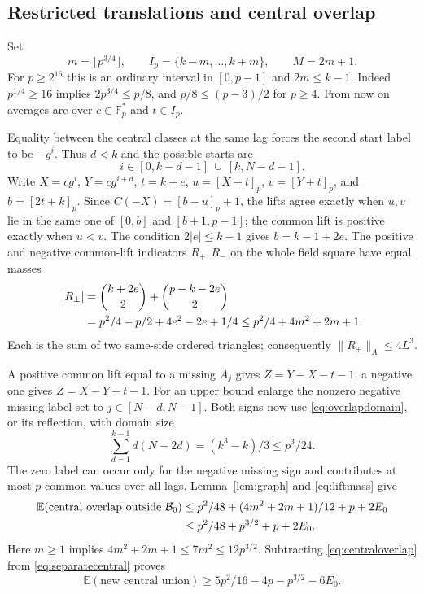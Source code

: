 \documentclass[10pt]{amsart}
\theoremstyle{remark}
\newcommand{\Fp}{\mathbb F_p}
\newcommand{\E}{\mathbb E}
\newcommand{\normA}[1]{\lVert #1\rVert_A}
\newcommand{\Bset}{\mathcal B}
\begin{document}
\subsection{Restricted translations and central overlap}
Set
\begin{equation}\label{eq:translationinterval}
 m=\lfloor p^{3/4}\rfloor,\qquad I_p=\{k-m,\ldots,k+m\},\qquad M=2m+1.
\end{equation}
For $p\ge2^{16}$ this is an ordinary interval in $[0,p-1]$ and
$2m\le k-1$. Indeed $p^{1/4}\ge16$ implies $2p^{3/4}\le p/8$,
and $p/8\le(p-3)/2$ for $p\ge4$. From now on averages are over
$c\in\Fp^*$ and $t\in I_p$.

Equality between the central classes at the same lag forces the
second start label to be $-g^i$. Thus $d<k$ and the possible starts are
\begin{equation}\label{eq:centralstarts}
 i\in[0,k-d-1]\ \cup\ [k,N-d-1].
\end{equation}
Write $X=cg^i$, $Y=cg^{i+d}$, $t=k+e$, $u=[X+t]_p$,
$v=[Y+t]_p$, and $b=[2t+k]_p$. Since $C(-X)=[b-u]_p+1$,
the lifts agree exactly when $u,v$ lie in the same one of $[0,b]$
and $[b+1,p-1]$; the common lift is positive exactly when $u<v$.
The condition $2|e|\le k-1$ gives $b=k-1+2e$.
The positive and negative common-lift indicators $R_+,R_-$ on the
whole field square have equal masses
\begin{align}\label{eq:liftmass}
 |R_\pm|&=\binom{k+2e}{2}+\binom{p-k-2e}{2}\notag\\
 &=p^2/4-p/2+4e^2-2e+1/4
 \le p^2/4+4m^2+2m+1.
\end{align}
Each is the sum of two same-side ordered triangles; consequently
$\normA{R_\pm}\le4L^3$.

A positive common lift equal to a missing $A_j$ gives
$Z=Y-X-t-1$; a negative one gives $Z=X-Y-t-1$.
For an upper bound enlarge the nonzero negative missing-label set to
$j\in[N-d,N-1]$. Both signs now use \eqref{eq:overlapdomain}, or its
reflection, with domain size
\[
 \sum_{d=1}^{k-1}d(N-2d)=(k^3-k)/3\le p^3/24.
\]
The zero label can occur only for the negative missing sign and
contributes at most $p$ common values over all lags.
Lemma~\ref{lem:graph} and \eqref{eq:liftmass} give
\begin{align}\label{eq:centraloverlap}
 \E(\text{central overlap outside }\Bset_0)
 &\le p^2/48+(4m^2+2m+1)/12+p+2E_0\notag\\
 &\le p^2/48+p^{3/2}+p+2E_0.
\end{align}
Here $m\ge1$ implies $4m^2+2m+1\le7m^2\le12p^{3/2}$.
Subtracting \eqref{eq:centraloverlap} from \eqref{eq:separatecentral}
proves
\begin{equation}\label{eq:centralunion}
 \E(\text{new central union})\ge5p^2/16-4p-p^{3/2}-6E_0.
\end{equation}
\end{document}
